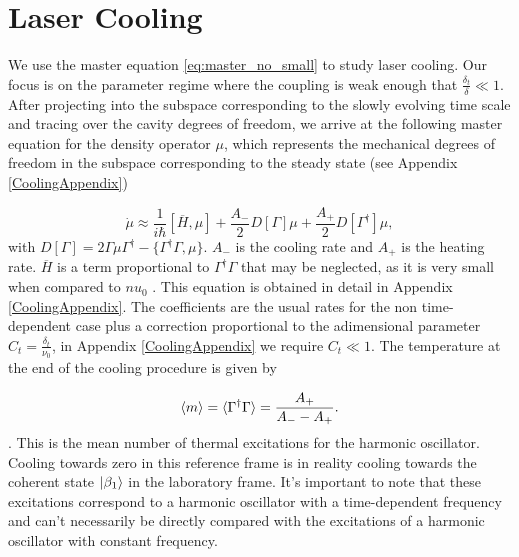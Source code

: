 \documentclass[reprint, amsmath,amssymb, aps,pra]{revtex4-1}
\begin{document}
\section{Laser Cooling}\label{LasCool}

We use the master equation \eqref{eq:master_no_small} to study laser
cooling. Our focus is on the parameter regime where the coupling is
weak enough that $\frac{\delta_t}{\delta}\ll 1$. After projecting into
the subspace corresponding to the slowly evolving time scale and
tracing over the cavity degrees of freedom, we arrive at the following
master equation for the density operator $\mu$, which represents the
mechanical degrees of freedom in the subspace corresponding to the
steady state (see Appendix \ref{CoolingAppendix})

\begin{equation}\label{eq:ProyectedMasterEqCooling}
\dot{\mu} \approx \frac{1}{i\hbar}[\overline{H},\mu] + \frac{A_-}{2}D[\Gamma]\mu + \frac{A_+}{2}D[\Gamma^\dagger]\mu, 
\end{equation}
with
$D[\Gamma] = 2\Gamma \mu \Gamma^\dagger -\{\Gamma^\dagger \Gamma,
\mu\}$. $A_-$ is the cooling rate and $A_+$ is the heating rate.
 $\overline{H}$ is a term proportional
to $\Gamma^\dagger \Gamma$ that may be neglected, as it is very small when compared to $nu_0$ . This equation is obtained in detail in
Appendix \ref{CoolingAppendix}. The coefficients are the usual rates
for the non time-dependent case plus a correction proportional to the
adimensional parameter $C_t=\frac{\delta_t}{\nu_0}$, in Appendix
\ref{CoolingAppendix} we require $C_t \ll 1$. The temperature at the
end of the cooling procedure is given by

\begin{equation}
\expval{m} =\langle \Gamma^\dagger \Gamma \rangle = \frac{A_+}{A_- - A_+}.
\end{equation}
.
This is the mean number of thermal excitations for the harmonic
oscillator. Cooling towards zero in this reference frame is in
reality cooling towards the coherent state $\ket{\beta_1}$ in the
laboratory frame. It's important to note that these excitations
correspond to a harmonic oscillator with a time-dependent frequency
and can't necessarily be directly compared with the excitations of a
harmonic oscillator with constant frequency.
\end{document}
